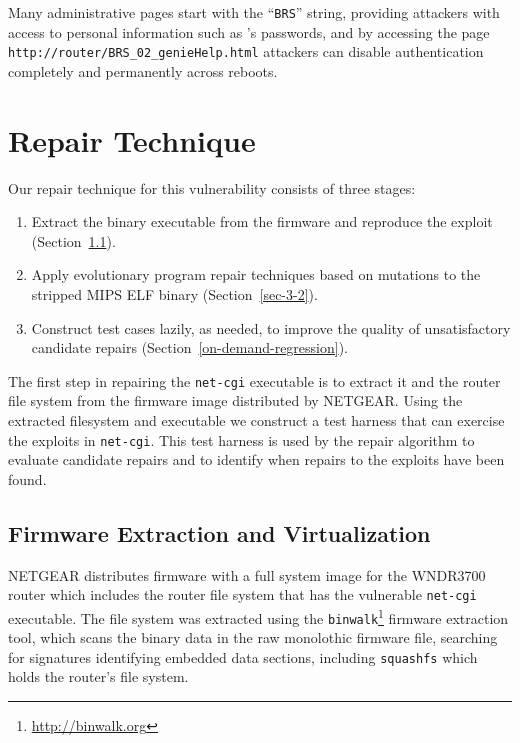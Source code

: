 \documentclass{sigcomm-alternate}
\begin{document}
{Many administrative pages start with the ``{\tt BRS}'' string, providing
attackers with access to personal information such as 's
passwords, and by accessing the page
\texttt{http://router/BRS\_02\_genieHelp.html} attackers can
disable authentication completely and permanently
across reboots.

\section{Repair Technique}
\label{sec-3}

Our repair technique for this vulnerability consists of three stages:
\begin{enumerate}
\item Extract the binary executable from the firmware and reproduce
the exploit (Section~\ref{sec-3-1}).
\item Apply evolutionary program repair techniques based on mutations to
the stripped MIPS ELF binary (Section~\ref{sec-3-2}). 
\item Construct test cases lazily, as needed, to improve the quality of
unsatisfactory candidate repairs (Section~\ref{on-demand-regression}). 
\end{enumerate} 

The first step in repairing the \texttt{net-cgi} executable is to extract
it and the router file system from the firmware image distributed by
NETGEAR.  Using the extracted filesystem and executable we construct a test
harness that can exercise the exploits in \texttt{net-cgi}.  This test harness
is used by the repair algorithm to evaluate candidate repairs and to
identify when repairs to the exploits have been found.

\subsection{Firmware Extraction and Virtualization}
\label{sec-3-1}
NETGEAR distributes firmware with a full system image for the
WNDR3700 router which includes the router file system that has the
vulnerable \texttt{net-cgi} executable. 
The file system was extracted using the 
\texttt{binwalk}\footnote{\url{http://binwalk.org}} firmware extraction
tool, which scans the binary data in the raw monolothic firmware file,
searching for signatures
identifying embedded data sections,
including {\tt squashfs}\cite{lougher2006squashfs} which
holds the router's file system.

}
\end{document}
